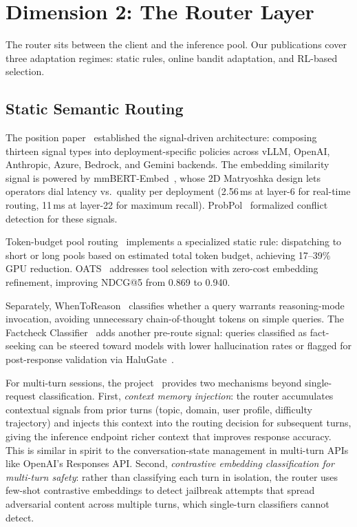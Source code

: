 \section{Dimension 2: The Router Layer}
\label{sec:router}

The router sits between the client and the inference pool.  Our
publications cover three adaptation regimes: static rules, online
bandit adaptation, and RL-based selection.

\subsection{Static Semantic Routing}
\label{sec:router:static}

The \vsr{} position paper~\cite{vllmsr2026} established the
signal-driven architecture: composing thirteen signal types into
deployment-specific policies across vLLM, OpenAI, Anthropic, Azure,
Bedrock, and Gemini backends.  The embedding similarity signal is
powered by mmBERT-Embed~\cite{mmberted2025}, whose 2D Matryoshka
design lets operators dial latency vs.\ quality per deployment
(2.56\,ms at layer-6 for real-time routing, 11\,ms at layer-22 for
maximum recall).  ProbPol~\cite{probpol2026} formalized conflict
detection for these signals.

Token-budget pool routing~\cite{poolrouting2026} implements a
specialized static rule: dispatching to short or long pools based on
estimated total token budget, achieving 17--39\% GPU reduction.
OATS~\cite{oats2026} addresses tool selection with zero-cost
embedding refinement, improving NDCG@5 from 0.869 to 0.940.

Separately, WhenToReason~\cite{wang2025reason} classifies whether a
query warrants reasoning-mode invocation, avoiding unnecessary
chain-of-thought tokens on simple queries.  The Factcheck
Classifier~\cite{factcheck2026} adds another pre-route signal:
queries classified as fact-seeking can be steered toward models with
lower hallucination rates or flagged for post-response validation
via HaluGate~\cite{halugate2025}.

For multi-turn sessions, the \vsr{} project~\cite{vllmsr2026}
provides two mechanisms beyond single-request classification.
First, \emph{context memory injection}: the router accumulates
contextual signals from prior turns (topic, domain, user profile,
difficulty trajectory) and injects this context into the routing
decision for subsequent turns, giving the inference endpoint richer context that improves response
accuracy.  This is similar in spirit to the conversation-state
management in multi-turn APIs like OpenAI's Responses API.  Second, \emph{contrastive embedding classification
for multi-turn safety}: rather than classifying each turn in
isolation, the router uses few-shot contrastive embeddings to detect
jailbreak attempts that spread adversarial content across multiple
turns, which single-turn classifiers cannot detect.

